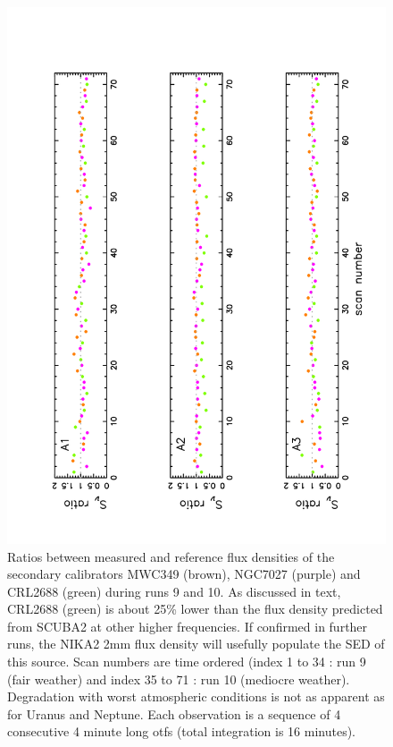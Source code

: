\begin{figure}
\begin{center}
  \includegraphics[clip, angle=-90, scale=0.6]{Figures/Ratio_vs_index_sec_r9_r10.pdf}
  \caption{Ratios between measured and reference flux densities of  the secondary calibrators  MWC349 (brown), NGC7027 (purple)  and CRL2688 (green)
  during runs 9 and 10. As discussed in text, CRL2688 (green) is about 25\% lower than the flux density predicted from SCUBA2 at other higher frequencies.
  If confirmed in further runs, the NIKA2 2mm flux density will usefully populate the SED of this source.  
    Scan numbers are time ordered (index 1 to 34 : run 9 (fair weather) and index 35 to 71 : run 10 (mediocre weather).
    Degradation with worst atmospheric conditions is not as apparent as for Uranus and Neptune.
    Each observation is a sequence of 4 consecutive 4 minute long otfs (total integration is 16 minutes).}
\label{fig:ratio_cal_sec}
\end{center}
\end{figure}


